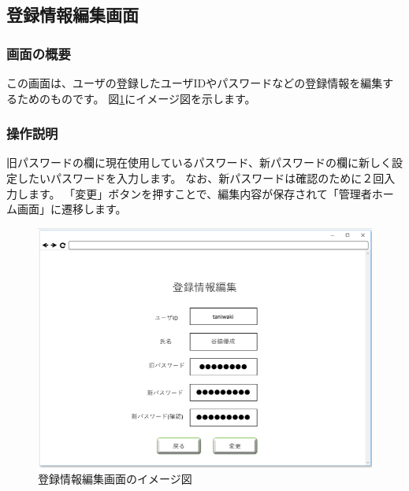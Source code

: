 
\newpage

\subsection{登録情報編集画面}
\subsubsection{画面の概要}
この画面は、ユーザの登録したユーザIDやパスワードなどの登録情報を編集するためのものです。
図\ref{fig:06}にイメージ図を示します。

\subsubsection{操作説明}
旧パスワードの欄に現在使用しているパスワード、新パスワードの欄に新しく設定したいパスワードを入力します。
なお、新パスワードは確認のために２回入力します。
「変更」ボタンを押すことで、編集内容が保存されて「管理者ホーム画面」に遷移します。

\begin{figure}[htbp]
  \begin{center}
    \includegraphics[width=0.7\linewidth,clip]{./img/06.png}
    \caption{登録情報編集画面のイメージ図}\label{fig:06}
  \end{center}
\end{figure}

